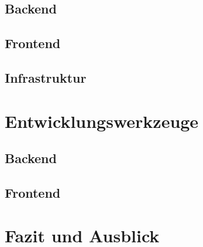\documentclass[a4paper, 10pt, conference]{IEEEtran}
\begin{document}
\subsection{Backend}\label{subsec:backend}



\subsection{Frontend}\label{subsec:frontend}



\subsection{Infrastruktur}\label{subsec:infrastruktur}





\section{Entwicklungswerkzeuge}\label{sec:entwicklungswerkzeuge}



\subsection{Backend}\label{subsec:backend-dev-tools}




\subsection{Frontend}\label{subsec:frontend-dev-tools}



\section{Fazit und Ausblick}\label{sec:fazit}




\printbibliography
\end{document}
